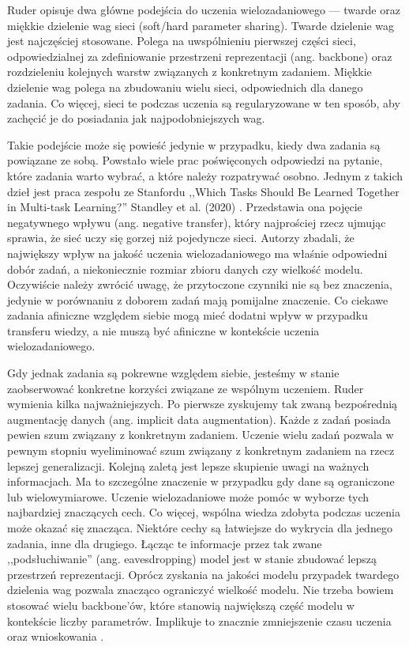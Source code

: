 Ruder opisuje dwa główne podejścia do uczenia wielozadaniowego — twarde oraz miękkie dzielenie wag sieci (soft/hard parameter sharing). Twarde dzielenie wag jest najczęściej stosowane. Polega na uwspólnieniu pierwszej części sieci, odpowiedzialnej za zdefiniowanie przestrzeni reprezentacji (ang. backbone) oraz rozdzieleniu kolejnych warstw związanych z konkretnym zadaniem. Miękkie dzielenie wag polega na zbudowaniu wielu sieci, odpowiednich dla danego zadania. Co więcej, sieci te podczas uczenia są regularyzowane w ten sposób, aby zachęcić je do posiadania jak najpodobniejszych wag.

Takie podejście może się powieść jedynie w przypadku, kiedy dwa zadania są powiązane ze sobą. Powstało wiele prac poświęconych odpowiedzi na pytanie, które zadania warto wybrać, a które należy rozpatrywać osobno. Jednym z takich dzieł jest praca zespołu ze Stanfordu ,,Which Tasks Should Be Learned Together in Multi-task Learning?'' Standley et al. (2020) \cite{standley2020tasks}. Przedstawia ona pojęcie negatywnego wpływu (ang. negative transfer), który najprościej rzecz ujmując sprawia, że sieć uczy się gorzej niż pojedyncze sieci. Autorzy zbadali, że największy wpływ na jakość uczenia wielozadaniowego ma właśnie odpowiedni dobór zadań, a niekoniecznie rozmiar zbioru danych czy wielkość modelu. Oczywiście należy zwrócić uwagę, że przytoczone czynniki nie są bez znaczenia, jedynie w porównaniu z doborem zadań mają pomijalne znaczenie. Co ciekawe zadania afiniczne względem siebie mogą mieć dodatni wpływ w przypadku transferu wiedzy, a nie muszą być afiniczne w kontekście uczenia wielozadaniowego.

Gdy jednak zadania są pokrewne względem siebie, jesteśmy w stanie zaobserwować konkretne korzyści związane ze wspólnym uczeniem. Ruder wymienia kilka najważniejszych. Po pierwsze zyskujemy tak zwaną bezpośrednią augmentację danych (ang. implicit data augmentation). Każde z zadań posiada pewien szum związany z konkretnym zadaniem. Uczenie wielu zadań pozwala w pewnym stopniu wyeliminować szum związany z konkretnym zadaniem na rzecz lepszej generalizacji. Kolejną zaletą jest lepsze skupienie uwagi na ważnych informacjach. Ma to szczególne znaczenie w przypadku gdy dane są ograniczone lub wielowymiarowe. Uczenie wielozadaniowe może pomóc w wyborze tych najbardziej znaczących cech. Co więcej, wspólna wiedza zdobyta podczas uczenia może okazać się znacząca. Niektóre cechy są łatwiejsze do wykrycia dla jednego zadania, inne dla drugiego. Łącząc te informacje przez tak zwane ,,podsłuchiwanie'' (ang. eavesdropping) model jest w stanie zbudować lepszą przestrzeń reprezentacji. Oprócz zyskania na jakości modelu przypadek twardego dzielenia wag pozwala znacząco ograniczyć wielkość modelu. Nie trzeba bowiem stosować wielu backbone'ów, które stanowią największą część modelu w kontekście liczby parametrów. Implikuje to znacznie zmniejszenie czasu uczenia oraz wnioskowania \cite{standley2020tasks}.